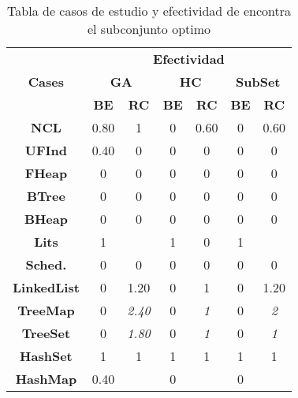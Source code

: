 \begin{table}[t]
\centering
\label{tab:t1}
\scriptsize
\begin{tabular}{|c c|cc|cc|cc|}
\midrule
\multicolumn{2}{|c|}{\multirow{3}{*}{\textbf{Cases}}} & \multicolumn{6}{c|}{\textbf{Efectividad}} \\
\cline{3-8}
\multicolumn{2}{|c|}{} & \multicolumn{2}{c}{\textbf{GA}} & \multicolumn{2}{c}{\textbf{HC}} & \multicolumn{2}{c|}{\textbf{SubSet}} \\
\multicolumn{2}{|c|}{} & \textbf{\tiny{BE}} & \textbf{\tiny{RC}} & \textbf{\tiny{BE}} & \textbf{\tiny{RC}} & \textbf{\tiny{BE}} & \textbf{\tiny{RC}} \\
\midrule
\multicolumn{2}{|c|}{\textbf{NCL}} & 0.80  &  1 & 0 &  0.60 &0 &  0.60 \\
\midrule
\multicolumn{2}{|c|}{\textbf{UFInd}}& 0.40 & 0  & 0  & 0  &0   & 0     \\
\midrule

\multicolumn{2}{|c|}{\textbf{FHeap}}& 0 & 0  &  0 &  0 &  0 &  0   \\
\midrule

\multicolumn{2}{|c|}{\textbf{BTree}} & 0 & 0  &  0 &  0 &  0 &  0  \\
\midrule

\multicolumn{2}{|c|}{\textbf{BHeap}}& 0 & 0  &  0 &  0 &  0 &  0   \\
\midrule

\multicolumn{2}{|c|}{\textbf{Lits}} &  1 &  & 1 &  0  & 1  &   \\
\midrule

\multicolumn{2}{|c|}{\textbf{Sched.}} &  0 & 0   & 0  &  0 &  0 & 0 \\

\midrule
\multicolumn{2}{|c|}{\textbf{LinkedList}} & 0 &  1.20 &  0 &  1 &0  &  1.20  \\
\midrule

\multicolumn{2}{|c|}{\textbf{TreeMap}} &  0 & \cellcolor{gray!25}\emph{2.40}  &  0 &  \cellcolor{gray!25} \emph{1}  &0 & \cellcolor{gray!25}\emph{2}   \\
\midrule

\multicolumn{2}{|c|}{\textbf{TreeSet}} &  0&\cellcolor{gray!25} \emph{1.80}  &  0 &   \cellcolor{gray!25}\emph{1    }  & 0 & \cellcolor{gray!25}\emph{1}   \\
\midrule

\multicolumn{2}{|c|}{\textbf{HashSet}} &  1 &1  &  1 &  1& 1  &  1  \\
\midrule

\multicolumn{2}{|c|}{\textbf{HashMap}} & 0.40  &   &0   &   &  0 &    \\
\hline
\end{tabular}

\caption{Tabla de casos de estudio y efectividad de encontra el subconjunto optimo}
\label{tab:efectividad}
\end{table}


